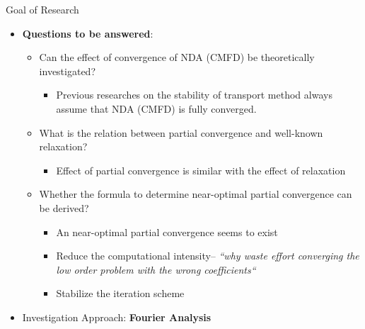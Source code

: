 \begin{frame}{Goal of Research }
\vspace{-1em}
\begin{itemize}
\item \textbf{Questions to be answered}:
\begin{itemize}
    \item Can the effect of convergence of NDA (CMFD) be theoretically investigated?
    \begin{itemize}
        \item Previous researches on the stability of transport method always assume that NDA (CMFD) is fully converged.
    \end{itemize}
    \vspace{-0.5em}
    \item What is the relation between partial convergence and well-known relaxation?
        \begin{itemize}
            \item Effect of partial convergence is similar with the effect of relaxation
        \end{itemize}
    \item Whether the formula to determine near-optimal partial convergence can be derived?
        \begin{itemize}
            \item An near-optimal partial convergence seems to exist
            \vspace{-0.5em}
            \item Reduce the computational intensity-- \it{``why waste effort converging the low order problem with the wrong coefficients``}
            \vspace{-0.5em}
            \item Stabilize the iteration scheme
        \end{itemize}
\end{itemize}
\item Investigation Approach: \textbf{Fourier Analysis}
\end{itemize}
\vfill
\end{frame}
